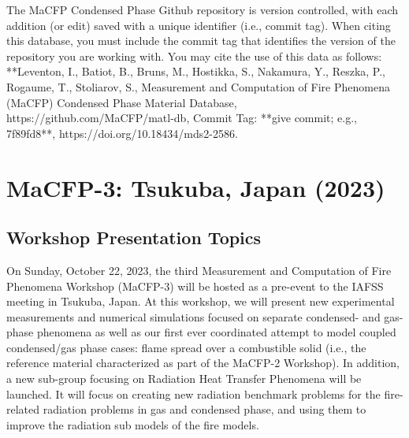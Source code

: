 \documentclass[12pt,demo]{article}
\begin{document}
The MaCFP Condensed Phase Github repository is version controlled, with each addition (or edit) saved with a unique identifier (i.e., commit tag). When citing this database, you must include the commit tag that identifies the version of the repository you are working with. You may cite the use of this data as follows:\\ 
**Leventon, I., Batiot, B., Bruns, M., Hostikka, S., Nakamura, Y., Reszka, P., Rogaume, T., Stoliarov, S., Measurement and Computation of Fire Phenomena (MaCFP) Condensed Phase Material Database, https://github.com/MaCFP/matl-db, Commit Tag: **give commit; e.g., 7f89fd8**, https://doi.org/10.18434/mds2-2586.

\section{MaCFP-3: Tsukuba, Japan (2023)}
\subsection{Workshop Presentation Topics}

On Sunday, October 22, 2023, the third Measurement and Computation of Fire Phenomena Workshop (MaCFP-3) will be hosted as a pre-event to the IAFSS meeting in Tsukuba, Japan. At this workshop, we will present new experimental measurements and numerical simulations focused on separate condensed- and gas-phase phenomena as well as our first ever coordinated attempt to model coupled condensed/gas phase cases: flame spread over a combustible solid (i.e., the reference material characterized as part of the MaCFP-2 Workshop). In addition, a new sub-group focusing on Radiation Heat Transfer Phenomena will be launched. It will focus on creating new radiation benchmark problems for the fire-related radiation problems in gas and condensed phase, and using them to improve the radiation sub models of the fire models.
\end{document}
